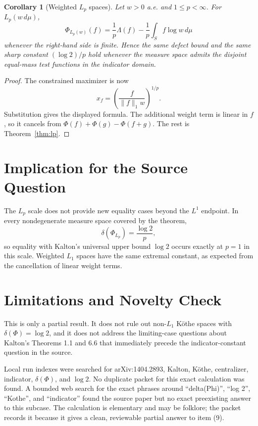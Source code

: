 \documentclass[11pt]{article}
\newtheorem{corollary}{Corollary}
\newcommand{\1}{\mathbf 1}
\begin{document}
\begin{corollary}[Weighted \(L_p\) spaces]
\label{cor:weighted}
Let \(w>0\) a.e. and \(1\leq p<\infty\). For \(L_p(w\,d\mu)\),
\[
  \Phi_{L_p(w)}(f)
  =\frac1p\Lambda(f)-\frac1p\int_S f\log w\,d\mu
\]
whenever the right-hand side is finite. Hence the same defect bound and the
same sharp constant \((\log2)/p\) hold whenever the measure space admits the
disjoint equal-mass test functions in the indicator domain.
\end{corollary}

\begin{proof}
The constrained maximizer is now
\[
  x_f=\left(\frac{f}{\|f\|_1 w}\right)^{1/p}.
\]
Substitution gives the displayed formula. The additional weight term is
linear in \(f\), so it cancels from
\(\Phi(f)+\Phi(g)-\Phi(f+g)\). The rest is Theorem~\ref{thm:lp}.
\end{proof}

\section*{Implication for the Source Question}

The \(L_p\) scale does not provide new equality cases beyond the \(L^1\)
endpoint. In every nondegenerate measure space covered by the theorem,
\[
  \delta(\Phi_{L_p})=\frac{\log2}{p},
\]
so equality with Kalton's universal upper bound \(\log2\) occurs exactly at
\(p=1\) in this scale. Weighted \(L_1\) spaces have the same extremal constant,
as expected from the cancellation of linear weight terms.

\section*{Limitations and Novelty Check}

This is only a partial result. It does not rule out non-\(L_1\) K\"othe spaces
with \(\delta(\Phi)=\log2\), and it does not address the limiting-case
questions about Kalton's Theorems 1.1 and 6.6 that immediately precede the
indicator-constant question in the source.

Local run indexes were searched for arXiv:1404.2893, Kalton, K\"othe,
centralizer, indicator, \(\delta(\Phi)\), and \(\log2\). No duplicate packet
for this exact calculation was found. A bounded web search for the exact
phrases around ``delta(Phi)'', ``log 2'', ``Kothe'', and ``indicator'' found
the source paper but no exact preexisting answer to this subcase. The
calculation is elementary and may be folklore; the packet records it because it
gives a clean, reviewable partial answer to item (9).
\end{document}
